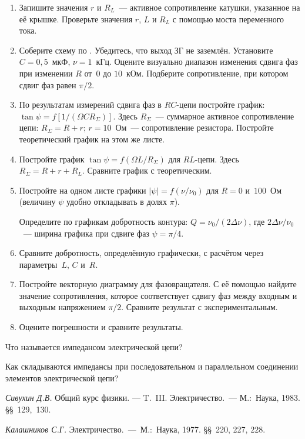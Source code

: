 \begin{lab:task}
\begin{enumerate}
	\item Запишите значения $r$ и $R_L$~--- активное сопротивление катушки,
указанное на её крышке. Проверьте значения $r$, $L$ и $R_L$ с
	помощью моста переменного тока.


	\item Соберите схему по . Убедитесь, что выход ЗГ не
заземлён. Установите $C=0,5$~мкФ, $\nu=1$~кГц. Оцените визуально
	диапазон изменения сдвига фаз при изменении $R$ от~$0$ до $10$~кОм.
Подберите сопротивление, при котором сдвиг фаз равен $\pi/2$.


	\item По результатам измерений сдвига фаз в $RC$-цепи постройте график:
$\tan\psi=f[1/(\Omega C R_{\Sigma})]$. Здесь
	$R_{\Sigma}$~--- суммарное активное сопротивление цепи: $R_{\Sigma}=R+r$;
$r=10$~Ом~--- сопротивление резистора.
	Постройте теоретический график на этом же листе.

	\item Постройте график $\tan\psi=f(\Omega L/R_{\Sigma})$ для $RL$-цепи.
Здесь $R_{\Sigma}=R+r+R_L$. Сравните график с
	теоретическим.

	\item Постройте на одном листе графики $|\psi|=f(\nu/\nu_0)$ для $R=0$
и~$100$~Ом (величину $\psi$ удобно откладывать в
	долях $\pi$).

	Определите по графикам добротность контура: $Q=\nu_0/(2\Delta\nu)$, где
$2\Delta\nu/\nu_0$~--- ширина графика при сдвиге
	фаз $\psi=\pi/4$.

	\item Сравните добротность, определённую графически, с расчётом через
параметры~$L$, $C$ и~$R$.

	\item Постройте векторную диаграмму для фазовращателя. С её помощью найдите
значение сопротивления, которое соответствует сдвигу фаз между входным и
выходным напряжением $\pi/2$. Сравните результат с экспериментальным.

	\item Оцените погрешности и сравните результаты.
	\end{enumerate}


\end{lab:task}


\begin{lab:questions}
	\item Что называется импедансом электрической цепи?
	\item Как складываются импедансы при последовательном и параллельном
соединении элементов электрической цепи?
\end{lab:questions}


\begin{lab:literature}
	\item \emph {Сивухин Д.В.} Общий курс физики. --- T.~III. Электричество.~---
М.:~Наука, 1983. \S\S~129,~130.
	\item \emph {Калашников С.Г.} Электричество.~---~М.:~Наука, 1977. \S\S~220,
227, 228.
\end{lab:literature}

